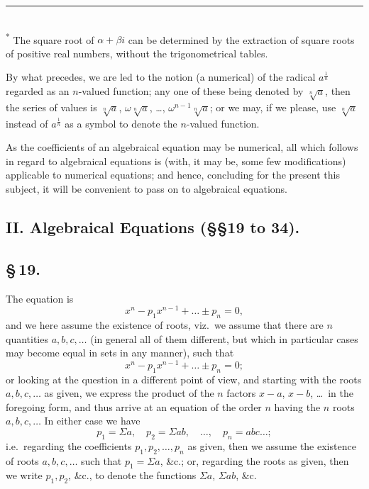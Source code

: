 \documentclass[11pt,a4paper]{book}
\begin{document}
\smallskip
\small\noindent\rule{0.4\textwidth}{0.4pt}\\
\textsuperscript{*} The square root of $\alpha + \beta i$ can be determined by the extraction of square roots of positive real numbers, without the trigonometrical tables.
\normalsize

By what precedes, we are led to the notion (a numerical) of the radical $a^{\frac{1}{n}}$ regarded as an $n$-valued function; any one of these being denoted by $\sqrt[n]{a}$, then the series of values is $\sqrt[n]{a}$, $\omega\sqrt[n]{a}$, \ldots, $\omega^{n-1}\sqrt[n]{a}$; or we may, if we please, use $\sqrt[n]{a}$ instead of $a^{\frac{1}{n}}$ as a symbol to denote the $n$-valued function.

As the coefficients of an algebraical equation may be numerical, all which follows in regard to algebraical equations is (with, it may be, some few modifications) applicable to numerical equations; and hence, concluding for the present this subject, it will be convenient to pass on to algebraical equations.

\subsection*{II. Algebraical Equations (\S\S 19 to 34).}

\subsection*{\S\,19.}

The equation is
\[
x^{n} - p_{1}x^{n-1} + \ldots \pm p_{n} = 0,
\]
and we here assume the existence of roots, viz.\ we assume that there are $n$ quantities $a, b, c, \ldots$ (in general all of them different, but which in particular cases may become equal in sets in any manner), such that
\[
x^{n} - p_{1}x^{n-1} + \ldots \pm p_{n} = 0;
\]
or looking at the question in a different point of view, and starting with the roots $a, b, c, \ldots$ as given, we express the product of the $n$ factors $x - a$, $x - b$, \ldots\ in the foregoing form, and thus arrive at an equation of the order $n$ having the $n$ roots $a, b, c, \ldots$ In either case we have
\[
p_{1} = \Sigma a, \quad p_{2} = \Sigma ab, \quad \ldots, \quad p_{n} = abc\ldots;
\]
i.e.\ regarding the coefficients $p_{1}, p_{2}, \ldots, p_{n}$ as given, then we assume the existence of roots $a, b, c, \ldots$ such that $p_{1} = \Sigma a$, \&c.; or, regarding the roots as given, then we write $p_{1}, p_{2}$, \&c., to denote the functions $\Sigma a$, $\Sigma ab$, \&c.
\end{document}
